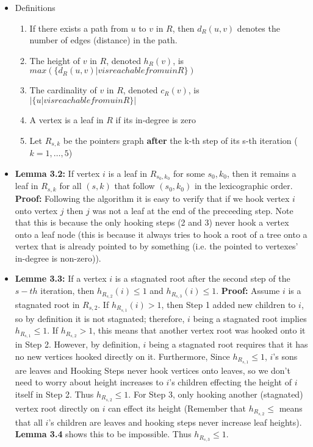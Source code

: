 \documentclass[a4paper]{article}
\begin{document}
\begin{itemize}
\begin{itemize}
\item Definitions
\begin{enumerate}
\item If there exists a path from $u$ to $v$ in $R$, then $d_R(u, v)$ denotes the number of edges (distance) in the path.

\item The height of $v$ in $R$, denoted $h_R(v)$, is $max(\{ d_R(u, v) | v is reachable from u in R \})$

\item The cardinality of $v$ in $R$, denoted $c_R(v)$, is $|\{u | v is reachable from u in R \}|$

\item A vertex is a leaf in $R$ if its in-degree is zero

\item Let $R_{s, k}$ be the pointers graph \textbf{after} the k-th step of its s-th iteration ($k = 1,\ldots, 5$)
\end{enumerate} 

\item \textbf{Lemma 3.2:} If vertex $i$ is a leaf in $R_{s_0, k_0}$ for some $s_0, k_0$, then it remains a leaf in $R_{s,k}$ for all $(s, k)$ that follow $(s_0, k_0)$ in the lexicographic order. \textbf{Proof:} Following the algorithm it is easy to verify that if we hook vertex $i$ onto vertex $j$ then $j$ was not a leaf at the end of the preceeding step. Note that this is because the only hooking steps (2 and 3) never hook a vertex onto a leaf node (this is because it always tries to hook a root of a tree onto a vertex that is already pointed to by something (i.e. the pointed to vertexes' in-degree is non-zero)).

\item \textbf{Lemme 3.3:} If a vertex $i$ is a stagnated root after the second step of the $s-th$ iteration, then $h_{R_{s, 2}}(i) \leq 1$ and $h_{R_{s, 3}}(i) \leq 1$. \textbf{Proof:} Assume $i$ is a stagnated root in $R_{s, 2}$. If $h_{R_{s, 1}}(i) > 1$, then Step 1 added new children to $i$, so by definition it is not stagnated; therefore, $i$ being a stagnated root implies $h_{R_{s, 1}} \leq 1$. If $h_{R_{s, 2}} > 1$, this means that another vertex root was hooked onto it in Step 2. However, by definition, $i$ being a stagnated root requires that it has no new vertices hooked directly on it. Furthermore, Since $h_{R_{s, 1}} \leq 1$, $i$'s sons are leaves and Hooking Steps never hook vertices onto leaves, so we don't need to worry about height increases to $i$'s children effecting the height of $i$ itself in Step 2. Thus $h_{R_{s, 2}} \leq 1$. For Step 3, only hooking another (stagnated) vertex root directly on $i$ can effect its height (Remember that $h_{R_{s, 2}} \leq$ means that all $i$'s children are leaves and hooking steps never increase leaf heights). \textbf{Lemma 3.4} shows this to be impossible. Thus $h_{R_{s, 3}} \leq 1$.


\end{itemize}
\end{itemize}
\end{document}
